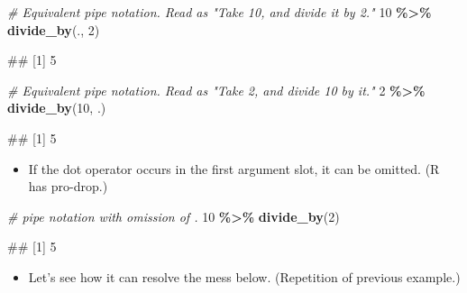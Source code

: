\documentclass[
]{book}
\newenvironment{Shaded}{\begin{snugshade}}{\end{snugshade}}
\newcommand{\CommentTok}[1]{\textcolor[rgb]{0.56,0.35,0.01}{\textit{#1}}}
\newcommand{\DecValTok}[1]{\textcolor[rgb]{0.00,0.00,0.81}{#1}}
\newcommand{\FunctionTok}[1]{\textcolor[rgb]{0.13,0.29,0.53}{\textbf{#1}}}
\newcommand{\NormalTok}[1]{#1}
\newcommand{\SpecialCharTok}[1]{\textcolor[rgb]{0.81,0.36,0.00}{\textbf{#1}}}
\providecommand{\tightlist}{%
  \setlength{\itemsep}{0pt}\setlength{\parskip}{0pt}}
\begin{document}
\begin{Shaded}
\begin{Highlighting}[]
\CommentTok{\# Equivalent pipe notation. Read as "Take 10, and divide it by 2."}
\DecValTok{10} \SpecialCharTok{\%\textgreater{}\%} \FunctionTok{divide\_by}\NormalTok{(., }\DecValTok{2}\NormalTok{)}
\end{Highlighting}
\end{Shaded}

\begin{Shaded}
\begin{Highlighting}[]
\NormalTok{\#\# [1] 5}
\end{Highlighting}
\end{Shaded}

\begin{Shaded}
\begin{Highlighting}[]
\CommentTok{\# Equivalent pipe notation. Read as "Take 2, and divide 10 by it."}
\DecValTok{2} \SpecialCharTok{\%\textgreater{}\%} \FunctionTok{divide\_by}\NormalTok{(}\DecValTok{10}\NormalTok{, .)}
\end{Highlighting}
\end{Shaded}

\begin{Shaded}
\begin{Highlighting}[]
\NormalTok{\#\# [1] 5}
\end{Highlighting}
\end{Shaded}

\begin{itemize}
\tightlist
\item
  If the dot operator occurs in the first argument slot, it can be omitted. (R has pro-drop.)
\end{itemize}

\begin{Shaded}
\begin{Highlighting}[]
\CommentTok{\# pipe notation with omission of \textquotesingle{}.\textquotesingle{}}
\DecValTok{10} \SpecialCharTok{\%\textgreater{}\%} \FunctionTok{divide\_by}\NormalTok{(}\DecValTok{2}\NormalTok{)}
\end{Highlighting}
\end{Shaded}

\begin{Shaded}
\begin{Highlighting}[]
\NormalTok{\#\# [1] 5}
\end{Highlighting}
\end{Shaded}

\begin{itemize}
\tightlist
\item
  Let's see how it can resolve the mess below. (Repetition of previous example.)
\end{itemize}
\end{document}
